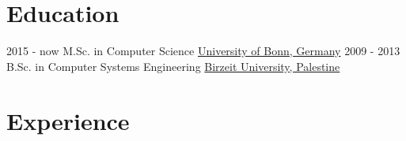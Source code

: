 \documentclass[letterpaper]{twentysecondcv} %
\begin{document}
\makeprofile %

\section{Education}

\begin{twenty} %
	\twentyitem
    	{2015 - now}
        {}
        {M.Sc.  in  Computer Science}
        {\href{https://www.uni-bonn.de/}{University of Bonn, Germany}}
        {}
        {}
	\twentyitem
    	{2009 - 2013}
		{}
        {B.Sc. in Computer Systems Engineering }
        {\href{https://www.birzeit.edu/en}{Birzeit University, Palestine}}
        {}
        {}
\end{twenty}




\section{Experience}
\end{document}
